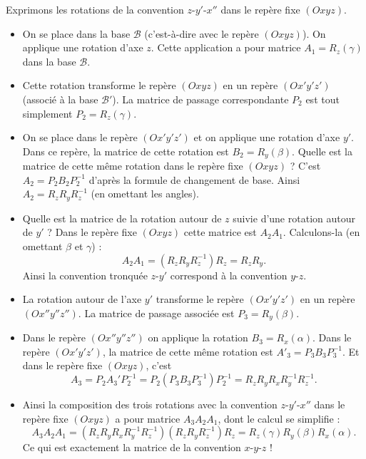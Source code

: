 \documentclass[11pt,class=report,crop=false]{standalone}
\begin{document}
Exprimons les rotations de la convention $z$-$y'$-$x''$ dans le repère fixe $(Oxyz)$.
\begin{itemize}
  \item On se place dans la base $\mathcal{B}$ (c'est-à-dire avec le repère $(Oxyz)$). On applique une rotation d'axe $z$. Cette application a pour matrice $A_1 = R_z(\gamma)$ dans la base $\mathcal{B}$.

  \item Cette rotation transforme le repère $(Oxyz)$ en un repère $(Ox'y'z')$ (associé à la base $\mathcal{B}'$). La matrice de passage correspondante $P_2$ est tout simplement $P_2 = R_z(\gamma)$.

  \item On se place dans le repère $(Ox'y'z')$ et on applique une rotation d'axe $y'$. Dans ce repère, la matrice de cette rotation est $B_2 = R_y(\beta)$. Quelle est la matrice de cette même rotation dans le repère fixe $(Oxyz)$ ?
  C'est $A_2 = P_2 B_2 P_2^{-1}$ d'après la formule de changement de base.
  Ainsi $A_2 = R_z R_y  R_z^{-1}$ (en omettant les angles).

  \item Quelle est la matrice de la rotation autour de $z$ suivie d'une rotation autour de $y'$ ?
  Dans le repère fixe $(Oxyz)$ cette matrice est $A_2A_1$. Calculons-la (en omettant $\beta$ et $\gamma$) :
  $$A_2 A_1 = (R_z R_y  R_z^{-1}) R_z = R_z R_y.$$
  Ainsi la convention tronquée $z$-$y'$ correspond à la convention $y$-$z$.

  \item La rotation autour de l'axe $y'$ transforme le repère $(Ox'y'z')$ en un repère $(Ox''y''z'')$. La matrice de passage associée est $P_3 = R_y(\beta)$.

  \item Dans le repère $(Ox''y''z'')$ on applique la rotation $B_3 = R_x(\alpha)$. Dans le repère $(Ox'y'z')$, la matrice de cette même rotation est $A'_3 = P_3 B_3 P_3^{-1}$. Et dans le repère fixe  $(Oxyz)$, c'est
  $$A_3 = P_2 A_3' P_2^{-1} = P_2 (P_3 B_3 P_3^{-1}) P_2^{-1} = R_z R_y R_x R_ y^{-1} R_z^{-1}.$$

  \item Ainsi la composition des trois rotations avec la convention $z$-$y'$-$x''$ dans le repère fixe $(Oxyz)$ a pour matrice $A_3A_2A_1$, dont le calcul se simplifie :
  $$A_3A_2A_1 = (R_z R_y R_x R_ y^{-1} R_z^{-1}) (R_z R_y  R_z^{-1}) R_z = R_z(\gamma) R_y(\beta) R_x(\alpha).$$
  Ce qui est exactement la matrice de la convention $x$-$y$-$z$ !

\end{itemize}
\end{document}
